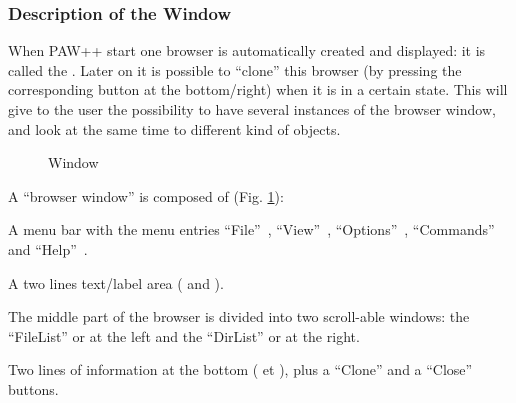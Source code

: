 \subsubsection{Description of the \MB{} Window}
\label{ref:rebrom}


When PAW++ start one browser is automatically created and displayed: it is 
called the \MB{}. Later on it is possible to ``clone'' this browser (by 
pressing the corresponding button at the bottom/right) when it is in a certain 
state. This will give to the user the possibility to have several instances of 
the browser window, and look at the same time to different kind of objects.

\begin{figure}
\caption{\MB{} Window}
\label{ref:FIGPKMF9}
\end{figure}

A ``browser window'' is composed of (Fig. \ref{ref:FIGPKMF9}):

\begin{UL}
\item
A menu bar with the menu entries ``File''~, ``View''~, 
``Options''~, ``Commands''~ and ``Help''~.
\item
A two lines text/label area ( and ).
\item
The middle part of the browser is divided into two scroll-able windows:
the ``FileList'' or \BW{}  at the left and the ``DirList'' or 
\OW{}  at the right.
\item
Two lines of information at the bottom ( et ), plus a 
``Clone''  and a ``Close''  buttons.
\end{UL}

